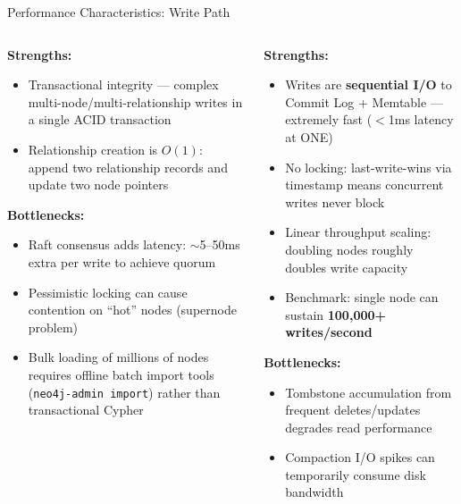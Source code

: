 \documentclass[aspectratio=169]{beamer}
\begin{document}
\begin{frame}{Performance Characteristics: Write Path}
  \begin{columns}[T]
      \begin{tcolorbox}[neo4jbox, title=Neo4j Write Performance]
        \small
        \textbf{Strengths:}
        \begin{itemize}\scriptsize
          \item Transactional integrity — complex multi-node/multi-relationship writes in a single ACID transaction
          \item Relationship creation is $O(1)$: append two relationship records and update two node pointers
        \end{itemize}
        \textbf{Bottlenecks:}
        \begin{itemize}\scriptsize
          \item Raft consensus adds latency: $\sim$5--50ms extra per write to achieve quorum
          \item Pessimistic locking can cause contention on ``hot'' nodes (supernode problem)
          \item Bulk loading of millions of nodes requires offline batch import tools (\texttt{neo4j-admin import}) rather than transactional Cypher
        \end{itemize}
      \end{tcolorbox}
      \begin{tcolorbox}[cassbox, title=Cassandra Write Performance]
        \small
        \textbf{Strengths:}
        \begin{itemize}\scriptsize
          \item Writes are \textbf{sequential I/O} to Commit Log + Memtable — extremely fast ($<$1ms latency at ONE)
          \item No locking: last-write-wins via timestamp means concurrent writes never block
          \item Linear throughput scaling: doubling nodes roughly doubles write capacity
          \item Benchmark: single node can sustain \textbf{100,000+ writes/second}
        \end{itemize}
        \textbf{Bottlenecks:}
        \begin{itemize}\scriptsize
          \item Tombstone accumulation from frequent deletes/updates degrades read performance
          \item Compaction I/O spikes can temporarily consume disk bandwidth
        \end{itemize}
      \end{tcolorbox}
  \end{columns}
\end{frame}
\end{document}
